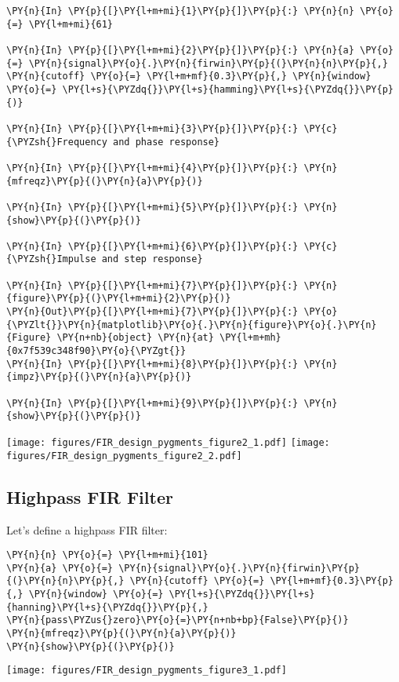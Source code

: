 \documentclass[a4paper,11pt,final]{article}
\begin{document}
\begin{Verbatim}[commandchars=\\\{\},frame=single,fontsize=\small, xleftmargin=0.5em]
\PY{n}{In} \PY{p}{[}\PY{l+m+mi}{1}\PY{p}{]}\PY{p}{:} \PY{n}{n} \PY{o}{=} \PY{l+m+mi}{61}

\PY{n}{In} \PY{p}{[}\PY{l+m+mi}{2}\PY{p}{]}\PY{p}{:} \PY{n}{a} \PY{o}{=} \PY{n}{signal}\PY{o}{.}\PY{n}{firwin}\PY{p}{(}\PY{n}{n}\PY{p}{,} \PY{n}{cutoff} \PY{o}{=} \PY{l+m+mf}{0.3}\PY{p}{,} \PY{n}{window} \PY{o}{=} \PY{l+s}{\PYZdq{}}\PY{l+s}{hamming}\PY{l+s}{\PYZdq{}}\PY{p}{)}

\PY{n}{In} \PY{p}{[}\PY{l+m+mi}{3}\PY{p}{]}\PY{p}{:} \PY{c}{\PYZsh{}Frequency and phase response}

\PY{n}{In} \PY{p}{[}\PY{l+m+mi}{4}\PY{p}{]}\PY{p}{:} \PY{n}{mfreqz}\PY{p}{(}\PY{n}{a}\PY{p}{)}

\PY{n}{In} \PY{p}{[}\PY{l+m+mi}{5}\PY{p}{]}\PY{p}{:} \PY{n}{show}\PY{p}{(}\PY{p}{)}

\PY{n}{In} \PY{p}{[}\PY{l+m+mi}{6}\PY{p}{]}\PY{p}{:} \PY{c}{\PYZsh{}Impulse and step response}

\PY{n}{In} \PY{p}{[}\PY{l+m+mi}{7}\PY{p}{]}\PY{p}{:} \PY{n}{figure}\PY{p}{(}\PY{l+m+mi}{2}\PY{p}{)}
\PY{n}{Out}\PY{p}{[}\PY{l+m+mi}{7}\PY{p}{]}\PY{p}{:} \PY{o}{\PYZlt{}}\PY{n}{matplotlib}\PY{o}{.}\PY{n}{figure}\PY{o}{.}\PY{n}{Figure} \PY{n+nb}{object} \PY{n}{at} \PY{l+m+mh}{0x7f539c348f90}\PY{o}{\PYZgt{}}
\PY{n}{In} \PY{p}{[}\PY{l+m+mi}{8}\PY{p}{]}\PY{p}{:} \PY{n}{impz}\PY{p}{(}\PY{n}{a}\PY{p}{)}

\PY{n}{In} \PY{p}{[}\PY{l+m+mi}{9}\PY{p}{]}\PY{p}{:} \PY{n}{show}\PY{p}{(}\PY{p}{)}
\end{Verbatim}
\texttt{[image: figures/FIR\_design\_pygments\_figure2\_1.pdf]}
\texttt{[image: figures/FIR\_design\_pygments\_figure2\_2.pdf]}


\subsection{Highpass FIR Filter}

Let's define a highpass FIR filter:


\begin{Verbatim}[commandchars=\\\{\},frame=single,fontsize=\small, xleftmargin=0.5em]
\PY{n}{n} \PY{o}{=} \PY{l+m+mi}{101}
\PY{n}{a} \PY{o}{=} \PY{n}{signal}\PY{o}{.}\PY{n}{firwin}\PY{p}{(}\PY{n}{n}\PY{p}{,} \PY{n}{cutoff} \PY{o}{=} \PY{l+m+mf}{0.3}\PY{p}{,} \PY{n}{window} \PY{o}{=} \PY{l+s}{\PYZdq{}}\PY{l+s}{hanning}\PY{l+s}{\PYZdq{}}\PY{p}{,}
\PY{n}{pass\PYZus{}zero}\PY{o}{=}\PY{n+nb+bp}{False}\PY{p}{)}
\PY{n}{mfreqz}\PY{p}{(}\PY{n}{a}\PY{p}{)}
\PY{n}{show}\PY{p}{(}\PY{p}{)}
\end{Verbatim}
\texttt{[image: figures/FIR\_design\_pygments\_figure3\_1.pdf]}
\end{document}
